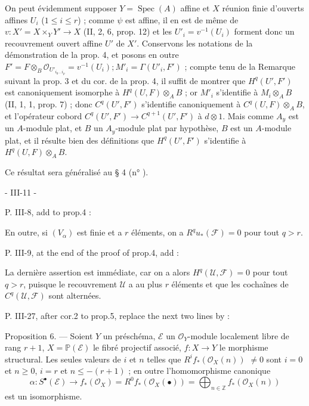 On peut évidemment supposer $Y = \operatorname{Spec}(A)$ affine et $X$ réunion finie d'ouverts affines $U_i$ ($1 \le i \le r$) ; comme $\psi$ est affine, il en est de même de $v : X' = X \times_Y Y' \to X$ (II, 2, 6, prop. 12) et les $U'_i = v^{-1}(U_i)$ forment donc un recouvrement ouvert affine $U'$ de $X'$. Conservons les notations de la démonstration de la prop. 4, et posons en outre $F' = F \otimes_B \mathcal{O}_{U'_{i_0 \dots i_p}} = v^{-1}(U_i) ; M'_i = \Gamma(U'_i, F')$ ; compte tenu de la Remarque suivant la prop. 3 et du cor. de la prop. 4, il suffit de montrer que $H^q(U', F')$ est canoniquement isomorphe à $H^q(U, F) \otimes_A B$ ; or $M'_i$ s'identifie à $M_i \otimes_A B$ (II, 1, 1, prop. 7) ; donc $C^q(U', F')$ s'identifie canoniquement à $C^q(U, F) \otimes_A B$, et l'opérateur cobord $C^q(U', F') \to C^{q+1}(U', F')$ à $d \otimes 1$. Mais comme $A_y$ est un $A$-module plat, et $B$ un $A_y$-module plat par hypothèse, $B$ est un $A$-module plat, et il résulte bien des définitions que $H^q(U', F')$ s'identifie à $H^q(U, F) \otimes_A B$.

Ce résultat sera généralisé au § 4 (n° ).

\newpage


- III-11 -

P. III-8, add to prop.4 :

En outre, si $(V_\alpha)$ est finie et a $r$ éléments, on a $R^q u_*(\mathcal{F}) = 0$ pour tout $q > r$.

P. III-9, at the end of the proof of prop.4, add :

La dernière assertion est immédiate, car on a alors $H^q(\mathcal{U}, \mathcal{F}) = 0$ pour tout $q > r$, puisque le recouvrement $\mathcal{U}$ a au plus $r$ éléments et que les cochaînes de $C^q(\mathcal{U}, \mathcal{F})$ sont alternées.

P. III-27, after cor.2 to prop.5, replace the next two lines by :

Proposition 6. — Soient $Y$ un préschéma, $\mathcal{E}$ un $\mathcal{O}_Y$-module localement libre de rang $r+1$, $X = \mathbb{P}(\mathcal{E})$ le fibré projectif associé, $f : X \to Y$ le morphisme structural. Les seules valeurs de $i$ et $n$ telles que $R^i f_*(\mathcal{O}_X(n))$ $\neq 0$ sont $i=0$ et $n \ge 0$, $i=r$ et $n \le -(r+1)$ ; en outre l'homomorphisme canonique
$$\alpha : S^\bullet(\mathcal{E}) \to f_*(\mathcal{O}_X) = R^0 f_*(\mathcal{O}_X(\bullet)) = \bigoplus_{n \in \mathbb{Z}} f_*(\mathcal{O}_X(n))$$
est un isomorphisme.

